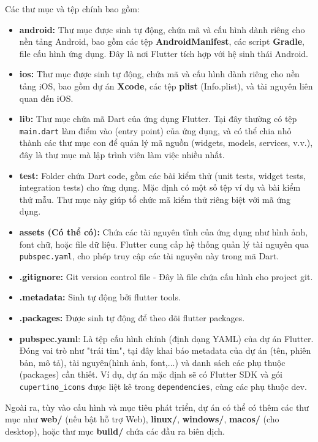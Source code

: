 \documentclass[../DoAn.tex]{subfiles}
\numberwithin{figure}{chapter}
\begin{document}
Các thư mục và tệp chính bao gồm: 
\begin{itemize}
\item \textbf{{android:}} Thư mục được sinh tự động, chứa mã và cấu hình dành riêng cho nền tảng Android, bao gồm các tệp \textbf{AndroidManifest}, các script \textbf{Gradle}, file cấu hình ứng dụng. Đây là nơi Flutter tích hợp với hệ sinh thái Android.
\item \textbf{{ios:}} Thư mục được sinh tự động, chứa mã và cấu hình dành riêng cho nền tảng iOS, bao gồm dự án \textbf{Xcode}, các tệp \textbf{plist} (Info.plist), và tài nguyên liên quan đến iOS.
\item \textbf{lib:} Thư mục chứa mã Dart của ứng dụng Flutter. Tại đây thường có tệp \texttt{main.dart} làm điểm vào (entry point) của ứng dụng, và có thể chia nhỏ thành các thư mục con để quản lý mã nguồn (widgets, models, services, v.v.), đây là thư mục mà lập trình viên làm việc nhiều nhất.
\item \textbf{{test:}} Folder chứa Dart code, gồm các bài kiểm thử (unit tests, widget tests, integration tests) cho ứng dụng. Mặc định có một số tệp ví dụ và bài kiểm thử mẫu. Thư mục này giúp tổ chức mã kiểm thử riêng biệt với mã ứng dụng.
\item \textbf{{assets (Có thể có):}} Chứa các tài nguyên tĩnh của ứng dụng như hình ảnh, font chữ, hoặc file dữ liệu. Flutter cung cấp hệ thống quản lý tài nguyên qua \texttt{pubspec.yaml}, cho phép truy cập các tài nguyên này trong mã Dart.
\item \textbf{.gitignore:} Git version control file - Đây là file chứa cấu hình cho project git.
\item \textbf{.metadata: } Sinh tự động bởi flutter tools.
\item \textbf{.packages: } Được sinh tự động để theo dõi flutter packages.
\item \textbf{{pubspec.yaml}}: Là tệp cấu hình chính (định dạng YAML) của dự án Flutter. Đóng vai trò như "trái tim", tại đây khai báo metadata của dự án (tên, phiên bản, mô tả), tài nguyên(hình ảnh, font,...) và danh sách các phụ thuộc (packages) cần thiết. Ví dụ, dự án mặc định sẽ có Flutter SDK và gói \texttt{cupertino\_icons} được liệt kê trong \texttt{dependencies}, cùng các phụ thuộc dev.
\end{itemize}

Ngoài ra, tùy vào cấu hình và mục tiêu phát triển, dự án có thể có thêm các thư mục như \textbf{web/} (nếu bật hỗ trợ Web), \textbf{linux/}, \textbf{windows/}, \textbf{macos/} (cho desktop), hoặc thư mục \textbf{build/} chứa các đầu ra biên dịch.
\end{document}
